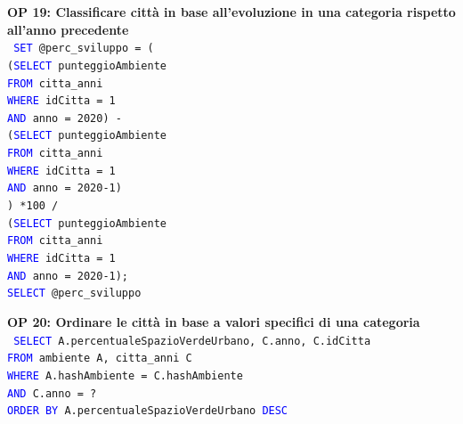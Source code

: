 \documentclass[a4paper,12pt]{report}
\begin{document}
            \newpage
            \noindent
            \textbf{OP 19: Classificare città in base all'evoluzione in una categoria rispetto all'anno precedente} \\
            \texttt{
                \textcolor{blue}{SET} @perc\_sviluppo = ( \\
                \null\qquad(\textcolor{blue}{SELECT} punteggioAmbiente \\ 
                \null\qquad  \textcolor{blue}{FROM} citta\_anni \\
                \null\qquad  \textcolor{blue}{WHERE} idCitta = 1 \\
                \null\qquad  \textcolor{blue}{AND} anno = 2020) - \\
                \null\qquad(\textcolor{blue}{SELECT} punteggioAmbiente \\
                \null\qquad  \textcolor{blue}{FROM} citta\_anni \\
                \null\qquad  \textcolor{blue}{WHERE} idCitta = 1 \\
                \null\qquad  \textcolor{blue}{AND} anno = 2020-1)\\
                \null\qquad) *100 /  \\
                \null\qquad(\textcolor{blue}{SELECT} punteggioAmbiente \\
                \null\qquad \textcolor{blue}{FROM} citta\_anni \\
                \null\qquad \textcolor{blue}{WHERE} idCitta = 1 \\
                \null\qquad \textcolor{blue}{AND} anno = 2020-1); \\
                \textcolor{blue}{SELECT} @perc\_sviluppo
            }
            
            \noindent
            \textbf{OP 20: Ordinare le città in base a valori specifici di una categoria} \\
            \texttt{
                \textcolor{blue}{SELECT} A.percentualeSpazioVerdeUrbano, C.anno, C.idCitta \\
                \textcolor{blue}{FROM} ambiente A, citta\_anni C \\
                \textcolor{blue}{WHERE} A.hashAmbiente = C.hashAmbiente  \\
                \textcolor{blue}{AND} C.anno = ? \\
                \textcolor{blue}{ORDER BY} A.percentualeSpazioVerdeUrbano \textcolor{blue}{DESC} \\
            }
            
\end{document}
